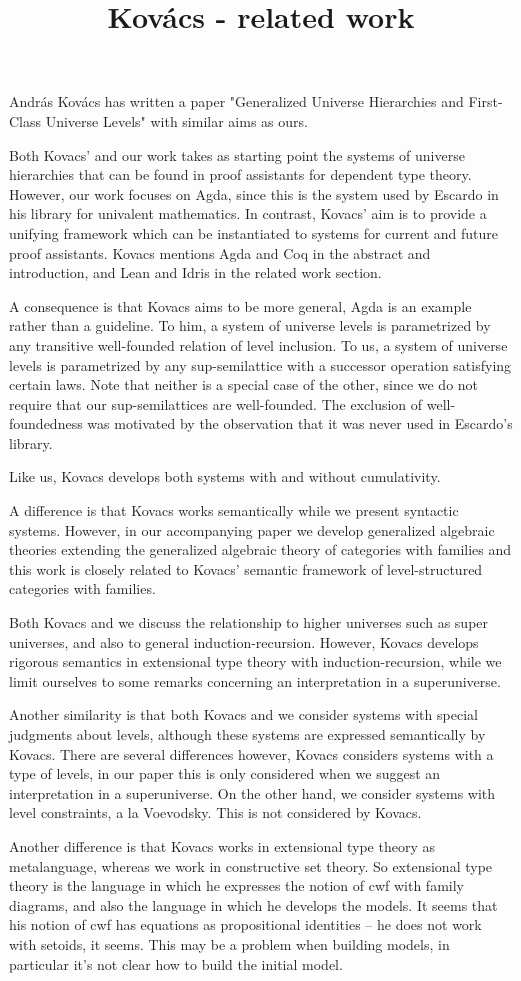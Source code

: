 \documentclass[11pt,a4paper]{article}
\begin{document}
\title{Kov\'acs - related work}

Andr\'as Kov\'acs has written a paper "Generalized Universe Hierarchies and First-Class Universe Levels" with similar aims as ours. 

Both Kovacs' and our work takes as starting point the systems of universe hierarchies that can be found in proof assistants for dependent type theory. However, our work focuses on Agda, since this is the system used by Escardo in his library for univalent mathematics. In contrast, Kovacs' aim is to provide a unifying framework which can be instantiated to systems for current and future proof assistants. Kovacs mentions Agda and Coq in the abstract and introduction, and Lean and Idris in the related work section.

A consequence is that Kovacs aims to be more general, Agda is an example rather than a guideline. To him, a system of universe levels is parametrized by any transitive well-founded relation of level inclusion. To us, a system of universe levels is parametrized by any sup-semilattice with a successor operation satisfying certain laws. Note that neither is a special case of the other, since we do not require that our sup-semilattices are well-founded. The exclusion of well-foundedness was motivated by the observation that it was never used in Escardo's library.

Like us, Kovacs develops both systems with and without cumulativity. 

A difference is that Kovacs works semantically while we present syntactic systems. However, in our accompanying paper we develop generalized algebraic theories extending the generalized algebraic theory of categories with families and this work is closely related to Kovacs' semantic framework of level-structured categories with families.

Both Kovacs and we discuss the relationship to higher universes such as super universes, and also to general induction-recursion. However, Kovacs develops rigorous semantics in extensional type theory with induction-recursion, while we limit ourselves to some remarks concerning an interpretation in a superuniverse.

Another similarity is that both Kovacs and we consider systems with special judgments about levels, although these systems are expressed semantically by Kovacs. There are several differences however, Kovacs considers systems with a type of levels, in our paper this is only considered when we suggest an interpretation in a superuniverse. On the other hand, we consider systems with level constraints, a la Voevodsky. This is not considered by Kovacs.

Another difference is that Kovacs works in extensional type theory as metalanguage, whereas we work in constructive set theory. So extensional type theory is the language in which he expresses the notion of cwf with family diagrams, and also the language in which he develops the models. It seems that his notion of cwf has equations as propositional identities -- he does not work with setoids, it seems. This may be a problem when building models, in particular it's not clear how to build the initial model. 
\end{document}
